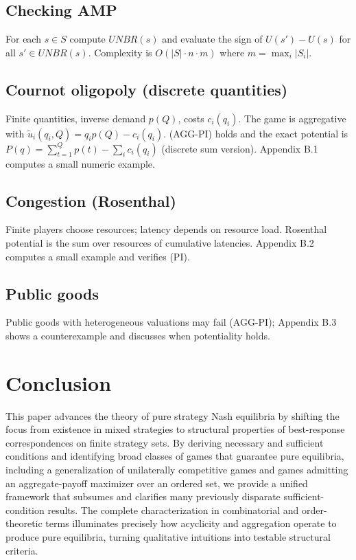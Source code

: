 \documentclass[11pt]{article}
\begin{document}
\subsection{Checking AMP}
For each \(s\in S\) compute \(UNBR(s)\) and evaluate the sign of
\(U(s')-U(s)\) for all \(s'\in UNBR(s)\). Complexity is \(O(|S|\cdot n\cdot m)\)
where \(m=\max_i |S_i|\).



\subsection{Cournot oligopoly (discrete quantities)}
Finite quantities, inverse demand \(p(Q)\), costs \(c_i(q_i)\). The game is
aggregative with \(\tilde u_i(q_i,Q)=q_i p(Q)-c_i(q_i)\). (AGG-PI) holds and
the exact potential is \(P(q)=\sum_{t=1}^Q p(t)-\sum_i c_i(q_i)\) (discrete
sum version). Appendix B.1 computes a small numeric example.

\subsection{Congestion (Rosenthal)}
Finite players choose resources; latency depends on resource load. Rosenthal
potential is the sum over resources of cumulative latencies. Appendix B.2
computes a small example and verifies (PI).

\subsection{Public goods}
Public goods with heterogeneous valuations may fail (AGG-PI); Appendix B.3
shows a counterexample and discusses when potentiality holds.

\section{Conclusion}
This paper advances the theory of pure strategy Nash equilibria by shifting the focus from existence in mixed strategies to structural properties of best-response correspondences on finite strategy sets. By deriving necessary and sufficient conditions and identifying broad classes of games that guarantee pure equilibria, including a generalization of unilaterally competitive games and games admitting an aggregate-payoff maximizer over an ordered set, we provide a unified framework that subsumes and clarifies many previously disparate sufficient-condition results. The complete characterization in combinatorial and order-theoretic terms illuminates precisely how acyclicity and aggregation operate to produce pure equilibria, turning qualitative intuitions into testable structural criteria.
\end{document}
